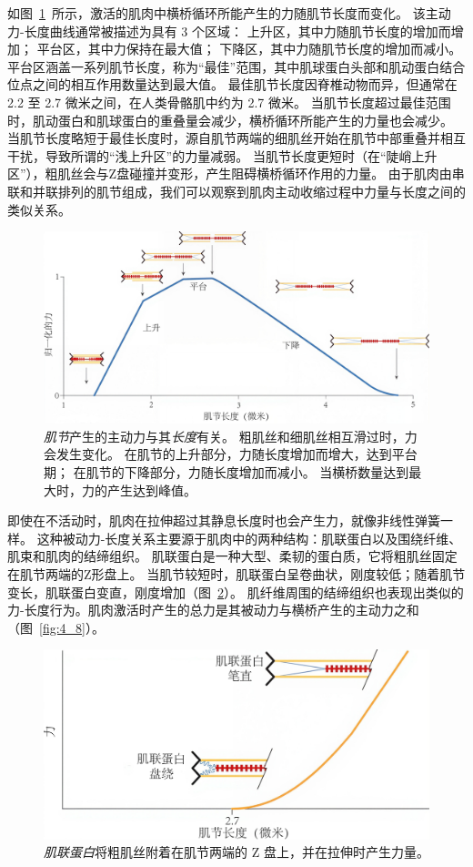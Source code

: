 如图~\ref{fig:4_6}~所示，激活的肌肉中横桥循环所能产生的力随肌节长度而变化。
该主动力-长度曲线通常被描述为具有 3 个区域：
上升区，其中力随肌节长度的增加而增加；
平台区，其中力保持在最大值；
下降区，其中力随肌节长度的增加而减小。
平台区涵盖一系列肌节长度，称为“最佳”范围，其中肌球蛋白头部和肌动蛋白结合位点之间的相互作用数量达到最大值。
最佳肌节长度因脊椎动物而异，但通常在 2.2 至 2.7 微米之间，在人类骨骼肌中约为 2.7 微米。
当肌节长度超过最佳范围时，肌动蛋白和肌球蛋白的重叠量会减少，横桥循环所能产生的力量也会减少。
当肌节长度略短于最佳长度时，源自肌节两端的细肌丝开始在肌节中部重叠并相互干扰，导致所谓的“浅上升区”的力量减弱。
当肌节长度更短时（在“陡峭上升区”），粗肌丝会与Z盘碰撞并变形，产生阻碍横桥循环作用的力量。
由于肌肉由串联和并联排列的肌节组成，我们可以观察到肌肉主动收缩过程中力量与长度之间的类似关系。

\begin{figure}[!htb]
	\centering
	\includegraphics[width=0.9\linewidth]{chap4/4_6}
	\caption{\textit{肌节}产生的主动力与其\textit{长度}有关。
		粗肌丝和细肌丝相互滑过时，力会发生变化。
		在肌节的上升部分，力随长度增加而增大，达到平台期；
		在肌节的下降部分，力随长度增加而减小。
		当横桥数量达到最大时，力的产生达到峰值\cite{gordon1966variation}。 \label{fig:4_6}}
\end{figure}


即使在不活动时，肌肉在拉伸超过其静息长度时也会产生力，就像非线性弹簧一样。
这种被动力-长度关系主要源于肌肉中的两种结构：肌联蛋白以及围绕纤维、肌束和肌肉的结缔组织。
肌联蛋白是一种大型、柔韧的蛋白质，它将粗肌丝固定在肌节两端的Z形盘上。
当肌节较短时，肌联蛋白呈卷曲状，刚度较低；随着肌节变长，肌联蛋白变直，刚度增加（图~\ref{fig:4_7}）。
肌纤维周围的结缔组织也表现出类似的力-长度行为。肌肉激活时产生的总力是其被动力与横桥产生的主动力之和（图~\ref{fig:4_8}）。

\begin{figure}[!htb]
	\centering
	\includegraphics[width=0.7\linewidth]{chap4/4_7}
	\caption{\textit{肌联蛋白}将粗肌丝附着在肌节两端的 Z 盘上，并在拉伸时产生力量。 \label{fig:4_7}}
\end{figure}

